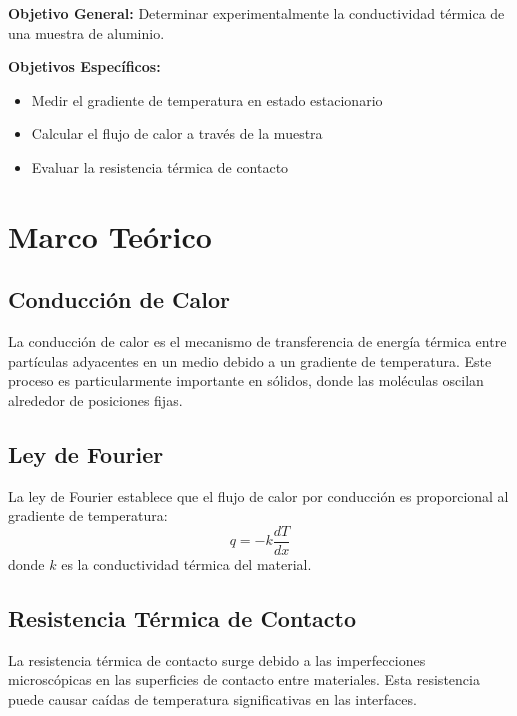 \documentclass[9pt,a4paper,twocolumn,twoside]{lab-class/lab}
\begin{document}
    \textbf{Objetivo General:}
    Determinar experimentalmente la conductividad térmica de una muestra de aluminio.

    \textbf{Objetivos Específicos:}
    \begin{itemize}
        \item Medir el gradiente de temperatura en estado estacionario
        \item Calcular el flujo de calor a través de la muestra
        \item Evaluar la resistencia térmica de contacto
    \end{itemize}

\section{Marco Teórico}
    \subsection{Conducción de Calor}

        La conducción de calor es el mecanismo de transferencia de energía térmica entre partículas adyacentes en un medio debido a un gradiente de temperatura. Este proceso es particularmente importante en sólidos, donde las moléculas oscilan alrededor de posiciones fijas.

    \subsection{Ley de Fourier}

        La ley de Fourier establece que el flujo de calor por conducción es proporcional al gradiente de temperatura:
        \begin{equation}
            q = -k \frac{dT}{dx}
        \end{equation}
        donde $k$ es la conductividad térmica del material.

    \subsection{Resistencia Térmica de Contacto}

        La resistencia térmica de contacto surge debido a las imperfecciones microscópicas en las superficies de contacto entre materiales. Esta resistencia puede causar caídas de temperatura significativas en las interfaces.
\end{document}
